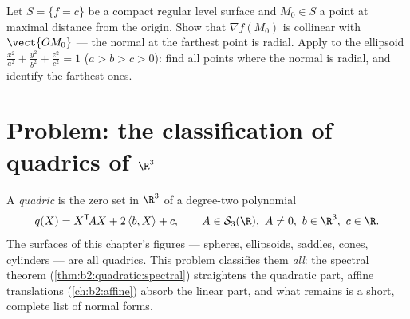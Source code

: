 \begin{exercise}[$\star\star\star$]\label{exo:b2:surfaces:12}
Let $S = \{f = c\}$ be a compact regular level surface and
$M_0 \in S$ a point at maximal distance from the origin. Show
that $\nabla f(M_0)$ is collinear with $\vect{OM_0}$ --- the
normal at the farthest point is radial. Apply to the ellipsoid
$\frac{x^2}{a^2} + \frac{y^2}{b^2} + \frac{z^2}{c^2} = 1$ ($a >
b > c > 0$): find all points where the normal is radial, and
identify the farthest ones.
\end{exercise}

\section{Problem: the classification of quadrics of
$\R^3$}

\begin{problem}\label{pb:b2:surfaces:1}
A \emph{quadric} is the zero set in $\R^3$ of a
degree-two polynomial
\[
q(X) = X^{\mathsf T}\!AX + 2\,\langle b, X\rangle + c,
\qquad A \in \mathcal S_3(\R),\ A \neq 0,\ b \in \R^3,\
c \in \R .
\]
The surfaces of this chapter's figures --- spheres,
ellipsoids, saddles, cones, cylinders --- are all quadrics.
This problem classifies them \emph{all}: the spectral theorem
(\cref{thm:b2:quadratic:spectral}) straightens the quadratic
part, affine translations (\cref{ch:b2:affine}) absorb the
linear part, and what remains is a short, complete list of
normal forms.


\end{problem}

